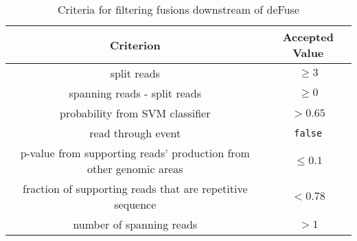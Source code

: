 \begin{description}
\begin{table} 
	\begin{center}
          \begin{tabular}{|c|c|}
            \textbf{Criterion} & \textbf{Accepted Value} \\ \hline
            split reads & $\geq 3$ \\
            spanning reads - split reads & $\geq 0$\\
            probability from SVM classifier & $ > 0.65$\\
            read through event & \texttt{false}\\
            p-value from supporting reads' production from other
            genomic areas & $\leq 0.1$ \\
            fraction of supporting reads that are repetitive sequence
                               & $< 0.78$\\
            number of spanning reads & $> 1$
          \end{tabular}
           \end{center}          
          \caption{Criteria for filtering fusions downstream of
                   deFuse} \label{filtering}
               \end{table}
               


\end{description}
































